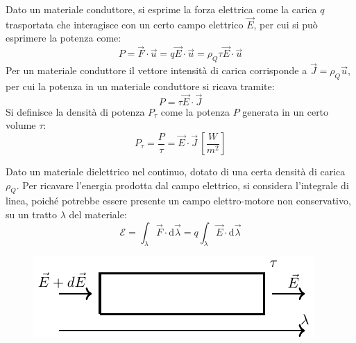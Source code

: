 \documentclass{article}
\newcommand{\df}{\mathrm{d}}
\numberwithin{equation}{subsection}
\begin{document}
Dato un materiale conduttore, si esprime la forza elettrica come la carica $q$ trasportata che interagisce con un certo campo elettrico $\vec{E}$, per cui si può esprimere 
la potenza come:
\begin{equation*}
    P=\vec{F}\cdot\vec{u}=q\vec{E}\cdot\vec{u}=\rho_Q\tau\vec{E}\cdot\vec{u}
\end{equation*}
Per un materiale conduttore il vettore intensità di carica corrisponde a $\vec{J}=\rho_Q\vec{u}$, per cui la potenza in un materiale conduttore si ricava tramite:
\begin{equation*}
    P=\tau\vec{E}\cdot\vec{J}
\end{equation*}
Si definisce la densità di potenza $P_\tau$ come la potenza $P$ generata in un certo volume $\tau$: 
\begin{equation}
    P_{\tau}=\displaystyle\frac{P}{\tau}=\vec{E}\cdot\vec{J}\,\left[\frac{W}{m^2}\right]
\end{equation}


Dato un materiale dielettrico nel continuo, dotato di una certa densità di carica $\rho_Q$. Per ricavare l'energia prodotta dal campo elettrico, si considera l'integrale 
di linea, poiché potrebbe essere presente un campo elettro-motore non conservativo, su un tratto $\lambda$ del materiale:
\begin{equation*}
    \mathscr{E}=\displaystyle\int_{\lambda}\vec{F}\cdot \df\vec{\lambda}=q\int_{\lambda}\vec{E}\cdot \df\vec{\lambda}
\end{equation*}

\begin{figure}[H]%
    \centering
    \includegraphics{materiale-dielettrico.pdf}
    \label{fig:materiale-dielettrico}
\end{figure}
\end{document}
